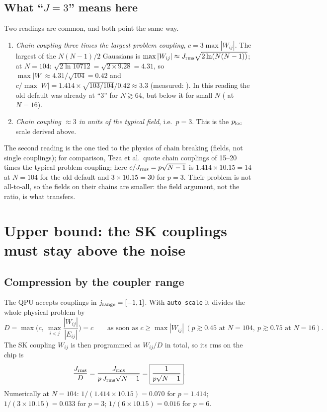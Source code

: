\documentclass[11pt,a4paper]{article}
\newcommand{\code}[1]{\nolinkurl{#1}}
\begin{document}
\subsection{What ``$J=3$'' means here}
Two readings are common, and both point the same way.
\begin{enumerate}
\item \emph{Chain coupling three times the largest problem coupling}, $c=3\max|W_{ij}|$. The largest of the $N(N-1)/2$ Gaussians is $\max|W_{ij}|\approx J_{\rm rms}\sqrt{2\ln(N(N-1))}$; at $N=104$: $\sqrt{2\ln 10712}=\sqrt{2\times9.28}=4.31$, so $\max|W|\approx4.31/\sqrt{104}=0.42$ and $c/\max|W|=1.414\times\sqrt{103/104}/0.42\approx3.3$ (measured: \ncOverMaxdefaultC). In this reading the old default was already at ``3'' for $N\gtrsim64$, but below it for small $N$ (\ncOverMaxdefaultA{} at $N=16$).
\item \emph{Chain coupling $\approx3$ in units of the typical field}, i.e.\ $p=3$. This is the $p_{\rm loc}$ scale derived above.
\end{enumerate}
The second reading is the one tied to the physics of chain breaking (fields, not single couplings); for comparison, Teza et al.\ quote chain couplings of 15--20 times the typical problem coupling; here $c/J_{\rm rms}=p\sqrt{N-1}$ is $1.414\times10.15=14$ at $N=104$ for the old default and $3\times10.15=30$ for $p=3$. Their problem is not all-to-all, so the fields on their chains are smaller: the field argument, not the ratio, is what transfers.

\section{Upper bound: the SK couplings must stay above the noise}
\subsection{Compression by the coupler range}
The QPU accepts couplings in $j_{\rm range}=[-1,1]$. With \code{auto_scale} it divides the whole physical problem by
\begin{equation}
D=\max\Big(c,\ \max_{i<j}\frac{|W_{ij}|}{|E_{ij}|}\Big)=c\qquad\text{as soon as } c\ge\max|W_{ij}|\ (p\gtrsim0.45\text{ at }N=104,\ p\gtrsim0.75\text{ at }N=16).
\end{equation}
The SK coupling $W_{ij}$ is then programmed as $W_{ij}/D$ in total, so its rms on the chip is
\begin{equation}
\frac{J_{\rm rms}}{D}=\frac{J_{\rm rms}}{p\,J_{\rm rms}\sqrt{N-1}}=\boxed{\frac{1}{p\sqrt{N-1}}}.
\end{equation}
Numerically at $N=104$: $1/(1.414\times10.15)=0.070$ for $p=1.414$; $1/(3\times10.15)=0.033$ for $p=3$; $1/(6\times10.15)=0.016$ for $p=6$.
\end{document}
